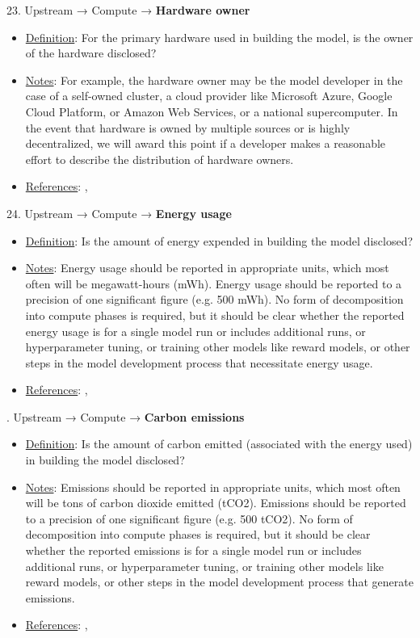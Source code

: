 23. Upstream → Compute → \textbf{Hardware owner}
\vspace{-\parskip}
\begin{itemize}
	\item
	\underline{Definition}: For the primary hardware used in building the model, is the owner of the hardware disclosed?
	\item
	\underline{Notes}: For example, the hardware owner may be the model developer in the case of a self-owned cluster, a cloud provider like Microsoft Azure, Google Cloud Platform, or Amazon Web Services, or a national supercomputer. In the event that hardware is owned by multiple sources or is highly decentralized, we will award this point if a developer makes a reasonable effort to describe the distribution of hardware owners.
	\item
	\underline{References}: \citet{sevilla2022compute}, \citet{hoffmann2022training}
\end{itemize}


24. Upstream → Compute → \textbf{Energy usage}
\vspace{-\parskip}
\begin{itemize}
	\item
	\underline{Definition}: Is the amount of energy expended in building the model disclosed?
	\item
	\underline{Notes}: Energy usage should be reported in appropriate units, which most often will be megawatt-hours (mWh). Energy usage should be reported to a precision of one significant figure (e.g. 500 mWh). No form of decomposition into compute phases is required, but it should be clear whether the reported energy usage is for a single model run or includes additional runs, or hyperparameter tuning, or training other models like reward models, or other steps in the model development process that necessitate energy usage.
	\item
	\underline{References}: \citet{lacoste2019quantifying}, \citet{patterson2021carbon}
\end{itemize}


. Upstream → Compute → \textbf{Carbon emissions}
\vspace{-\parskip}
\begin{itemize}
	\item
	\underline{Definition}: Is the amount of carbon emitted (associated with the energy used) in building the model disclosed?
	\item
	\underline{Notes}: Emissions should be reported in appropriate units, which most often will be tons of carbon dioxide emitted (tCO2). Emissions should be reported to a precision of one significant figure (e.g. 500 tCO2). No form of decomposition into compute phases is required, but it should be clear whether the reported emissions is for a single model run or includes additional runs, or hyperparameter tuning, or training other models like reward models, or other steps in the model development process that generate emissions.
	\item
	\underline{References}: \citet{lacoste2019quantifying}, \citet{patterson2021carbon}
\end{itemize}


